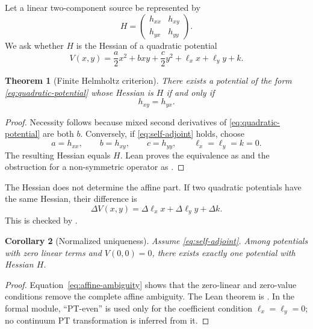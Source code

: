 \documentclass[11pt,a4paper]{article}
\newtheorem{theorem}{Theorem}[section]
\newtheorem{corollary}[theorem]{Corollary}
\theoremstyle{definition}
\theoremstyle{remark}
\begin{document}
Let a linear two-component source be represented by
\begin{equation}
  H=
  \begin{pmatrix}
    h_{xx} & h_{xy}\\
    h_{yx} & h_{yy}
  \end{pmatrix}.
\end{equation}
We ask whether $H$ is the Hessian of a quadratic potential
\begin{equation}
  V(x,y)=\frac{a}{2}x^2+bxy+\frac{c}{2}y^2+\ell_xx+\ell_yy+k.
  \label{eq:quadratic-potential}
\end{equation}

\begin{theorem}[Finite Helmholtz criterion]
There exists a potential of the form \eqref{eq:quadratic-potential} whose
Hessian is $H$ if and only if
\begin{equation}
  h_{xy}=h_{yx}.
  \label{eq:self-adjoint}
\end{equation}
\end{theorem}

\begin{proof}
Necessity follows because mixed second derivatives of
\eqref{eq:quadratic-potential} are both $b$. Conversely, if
\eqref{eq:self-adjoint} holds, choose
\begin{equation}
  a=h_{xx},\qquad b=h_{xy},\qquad c=h_{yy},
  \qquad \ell_x=\ell_y=k=0.
\end{equation}
The resulting Hessian equals $H$. Lean proves the equivalence as
 and the obstruction for a non-symmetric
operator as .
\end{proof}

The Hessian does not determine the affine part. If two quadratic potentials
have the same Hessian, their difference is
\begin{equation}
  \Delta V(x,y)=\Delta\ell_x x+\Delta\ell_y y+\Delta k.
  \label{eq:affine-ambiguity}
\end{equation}
This is checked by .

\begin{corollary}[Normalized uniqueness]
Assume \eqref{eq:self-adjoint}. Among potentials with zero linear terms and
$V(0,0)=0$, there exists exactly one potential with Hessian $H$.
\end{corollary}

\begin{proof}
Equation~\eqref{eq:affine-ambiguity} shows that the zero-linear and zero-value
conditions remove the complete affine ambiguity. The Lean theorem is
. In the formal module,
``PT-even'' is used only for the coefficient condition
$\ell_x=\ell_y=0$; no continuum PT transformation is inferred from it.
\end{proof}
\end{document}
